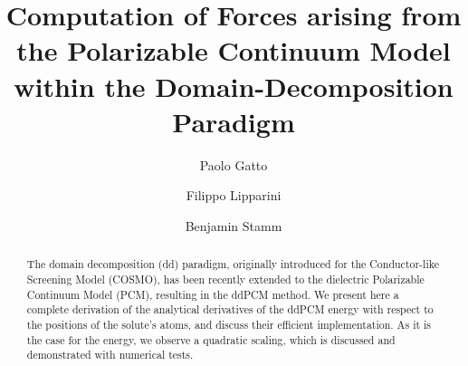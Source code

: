 \documentclass[aip,jcp,a4paper,11pt]{revtex4-1}
\begin{document}
\title{Computation of Forces arising from the Polarizable Continuum Model within the Domain-Decomposition Paradigm}

\author{Paolo Gatto}

\author{Filippo Lipparini}

\author{Benjamin Stamm}



\begin{abstract}
The domain decomposition (dd) paradigm, originally introduced for the Conductor-like Screening Model (COSMO), has been recently extended to the dielectric Polarizable Continuum Model (PCM), resulting in the ddPCM method. We present here a complete derivation of the analytical derivatives of the ddPCM energy with respect to the positions of the solute's atoms, and discuss their efficient implementation. As it is the case for the energy, we observe a quadratic scaling, which is discussed and demonstrated with numerical tests.  

\end{abstract}

\maketitle
\end{document}
